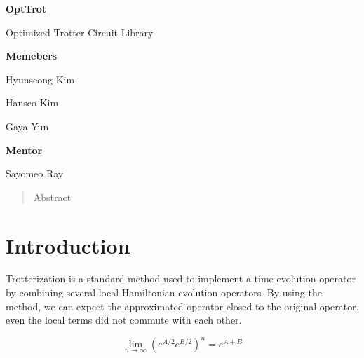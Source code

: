 \documentclass[a4paper,12pt]{article}
\newcommand{\courseName}{2024 IonQ summer Mentoring}
\newcommand{\assignmentTitle}{OptTrot}
\begin{document}
\begin{center}

    \vspace{0.5cm}
    {\Large\bfseries \assignmentTitle \par}
    {\large Optimized Trotter Circuit Library \par}
    \vspace{1cm}
    {
    \noindent
    \begin{minipage}{0.45\textwidth}
        \centering
        \textbf{Memebers}

        Hyunseong Kim

        Hanseo Kim
        
        Gaya Yun
    \end{minipage}
    \begin{minipage}{0.45\textwidth}
        \centering
        \textbf{Mentor}

        Sayomeo Ray
    \end{minipage}
    }
    \begin{abstract}
    Abstract
    \end{abstract}
\end{center}



\section{Introduction}

Trotterization is a standard method used to implement a time evolution operator 
by combining several local Hamiltonian evolution operators.
By using the method, we can expect the approximated operator closed to the original
operator, even the local terms did not commute with each other.

\begin{equation}
    \lim_{n \rightarrow \infty} (e^{A/2} e^{B/2})^n = e^{A+B}
\end{equation}
\end{document}
